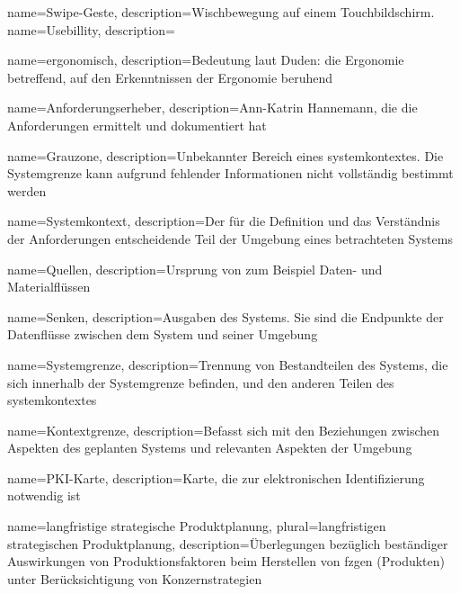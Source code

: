  {
name=Swipe-Geste,
	description={Wischbewegung auf einem Touchbildschirm.}
}
 {
name=Usebillity,
	description={}
}

 {
	name=ergonomisch,
	description={Bedeutung laut Duden: \glqq die Ergonomie betreffend, auf den Erkenntnissen der Ergonomie beruhend\grqq}}

 {
	name=Anforderungserheber,
	description={Ann-Katrin Hannemann, die die Anforderungen ermittelt und dokumentiert hat}}

 {
	name=Grauzone,
	description={Unbekannter Bereich eines \gls{systemkontext}es. Die Systemgrenze kann aufgrund fehlender Informationen nicht vollst\"andig bestimmt werden}}
	
 {
	name=Systemkontext,
	description={Der f\"ur die Definition und das Verst\"andnis der Anforderungen entscheidende Teil der Umgebung eines betrachteten Systems }}

 {
	name=Quellen,
	description={Ursprung von zum Beispiel Daten- und Materialfl\"ussen}}
	
 {
	name=Senken,
	description={Ausgaben des Systems. Sie sind die Endpunkte der Datenfl\"usse zwischen dem System und seiner Umgebung}}

 {
	name=Systemgrenze,
	description={Trennung von Bestandteilen des Systems, die sich innerhalb der Systemgrenze befinden, und den anderen Teilen des \gls{systemkontext}es}}
	
 {
	name=Kontextgrenze,
	description={Befasst sich mit den Beziehungen zwischen Aspekten des geplanten Systems und relevanten Aspekten der Umgebung}}
	
 {
	name=PKI-Karte,
	description={Karte, die zur elektronischen Identifizierung notwendig ist}}
	
 {
	name=langfristige strategische Produktplanung,
	plural=langfristigen strategischen Produktplanung,
	description={\"Uberlegungen bez\"uglich best\"andiger Auswirkungen von Produktionsfaktoren beim Herstellen von \gls{fzg}en (Produkten) unter Ber\"ucksichtigung von Konzernstrategien}}

